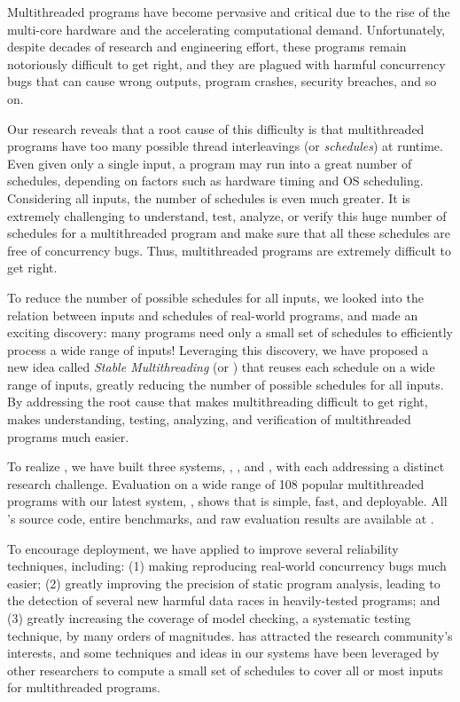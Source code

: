Multithreaded programs have become pervasive and critical due to the rise of the
multi-core hardware and the accelerating computational demand.
Unfortunately, despite decades of research and engineering effort, these
programs remain notoriously difficult to get right, and they are plagued with
harmful concurrency bugs that can cause wrong outputs, program crashes, security
breaches, and so on.

Our research reveals that a root cause of this difficulty is
that multithreaded programs have too many possible thread interleavings (or
\emph{schedules}) at runtime. Even given only a single input, a program may run 
into a great number of schedules, depending on factors such as hardware timing 
and OS scheduling. Considering all inputs, the number of schedules is even much 
greater. It is extremely challenging to understand, test, analyze, or verify 
this huge number of schedules for a multithreaded program and make sure that 
all these schedules are free of concurrency bugs. Thus, multithreaded programs 
are extremely difficult to get right.

To reduce the number of possible schedules for all inputs, we looked into the 
relation between inputs and schedules of real-world programs, and made an 
exciting discovery: many programs need only a small set of schedules to 
efficiently process a wide range of inputs! Leveraging this discovery, we have 
proposed a new idea called \emph{Stable Multithreading} (or \emph{\smt}) that 
reuses each schedule on a wide range of inputs, greatly reducing the number of 
possible schedules for all inputs. By addressing the root cause that makes 
multithreading difficult to get right, \smt makes understanding, testing, 
analyzing, and verification of multithreaded programs much easier.

To realize \smt, we have built three \smt systems, \tern, \peregrine, and 
\parrot, with each addressing a distinct research challenge. Evaluation on a 
wide range of 108 popular multithreaded programs with our latest \smt system, 
\parrot, shows that \smt is simple, fast, and deployable. All \parrot's source 
code, entire benchmarks, and raw evaluation results are available at \github.

To encourage deployment, we have applied \smt to improve several reliability 
techniques, including: (1) making reproducing real-world concurrency bugs much 
easier;  (2) greatly improving the precision of static program analysis, 
leading to the detection of several new harmful data races in heavily-tested 
programs; and (3) greatly increasing the coverage of model checking, a 
systematic testing technique, by many orders of magnitudes. \smt has attracted 
the research community's interests, and some techniques and ideas in our \smt 
systems have been leveraged by other researchers to compute a small set of 
schedules to cover all or most inputs for multithreaded programs.

% 
